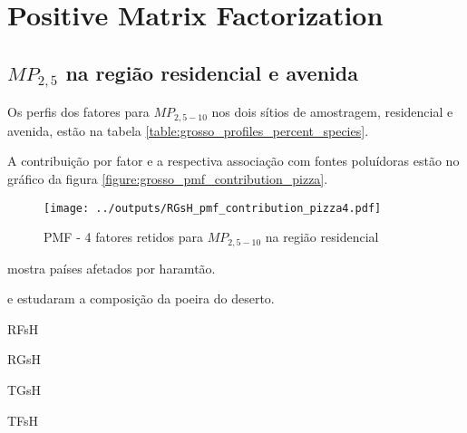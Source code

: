 \section{Positive Matrix Factorization}


\subsection{$MP_{2,5}$ na região residencial e avenida}

Os perfis dos fatores para $MP_{2,5-10}$ nos dois sítios de amostragem, 
residencial e avenida, estão na tabela \ref{table:grosso_profiles_percent_species}.

A contribuição por fator e a respectiva associação com fontes poluídoras
estão no gráfico da figura \ref{figure:grosso_pmf_contribution_pizza}. 

\begin{figure}[H]
\begin{center}
  \texttt{[image: ../outputs/RGsH\_pmf\_contribution\_pizza4.pdf]}
  \caption{PMF - 4 fatores retidos para $MP_{2,5-10}$ na região residencial}
\end{center}
\end{figure}



\cite{kaku2016}


\cite{prospero2002} mostra países afetados por haramtão. 

\cite{engelbrecht2009a} e \cite{engelbrecht2009b} estudaram a composição 
da poeira do deserto.


\begin{table}[H]
  \centering
  \caption{RFsH}
  
\end{table}

\begin{table}[H]
  \centering
  \caption{RGsH}
  
\end{table}

\begin{table}[H]
  \centering
  \caption{TGsH}
  
\end{table}


\begin{table}[H]
  \centering
  \caption{TFsH}
  
\end{table}

